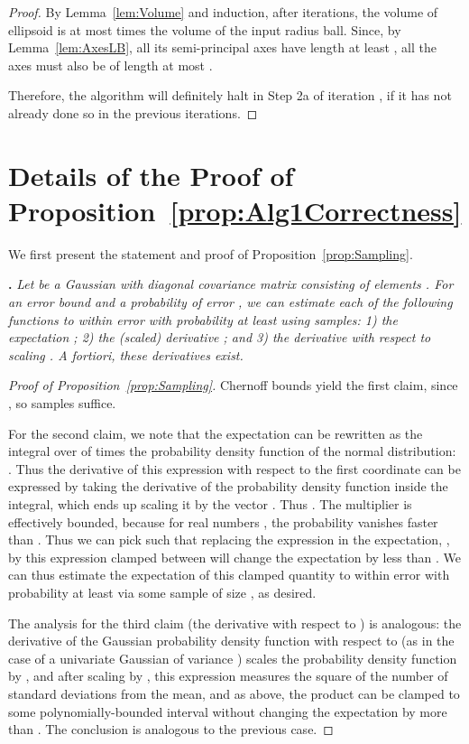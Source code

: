 \documentclass[11pt,letter]{article}
\numberwithin{nTheorems}{section}
\begin{document}
\begin{proof}
By Lemma~\ref{lem:Volume} and induction, after  iterations, the volume of ellipsoid  is at most  times the volume of the input radius  ball.
Since, by Lemma~\ref{lem:AxesLB}, all its semi-principal axes have length at least , all the axes must also be of length at most .

Therefore, the algorithm will definitely halt in Step 2a of iteration , if it has not already done so in the previous iterations.
\end{proof}

\iffalse
\section{Details of the Proof of Proposition~\ref{prop:Alg1Correctness}}
\label{sec:SingleCutProof}

We first present the statement and proof of Proposition~\ref{prop:Sampling}.

\medskip{}
{\bf .} \emph{Let  be a Gaussian with diagonal covariance matrix  consisting of elements .
  For an error bound  and a probability of error , we can estimate each of the following functions to within error  with probability at least  using  samples: 1) the expectation ; 2) the (scaled) derivative ; and 3) the derivative with respect to scaling . \emph{A fortiori}, these derivatives exist.}

\begin{proof}[Proof of Proposition~\ref{prop:Sampling}]

Chernoff bounds yield the first claim, since , so  samples suffice.

For the second claim, we note that the expectation can be rewritten as the integral over  of  times the probability density function of the normal distribution: . Thus the derivative of this expression with respect to the first coordinate  can be expressed by taking the derivative of the probability density function inside the integral, which ends up scaling it by the vector . Thus . The multiplier  is effectively bounded, because for real numbers , the probability  vanishes faster than . Thus we can pick  such that replacing the expression in the expectation, , by this expression clamped between  will change the expectation by less than . We can thus estimate the expectation of this clamped quantity to within error  with probability at least  via some sample of size , as desired.

The analysis for the third claim (the derivative with respect to ) is analogous: the derivative of the Gaussian probability density function with respect to  (as in the case of a univariate Gaussian of variance ) scales the probability density function by , and after scaling by , this expression measures the square of the number of standard deviations from the mean, and as above, the product  can be clamped to some polynomially-bounded interval  without changing the expectation by more than . The conclusion is analogous to the previous case.
\end{proof}
\end{document}
